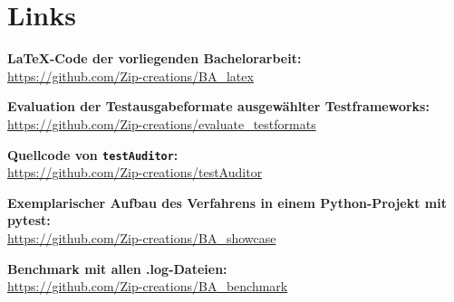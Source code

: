 \chapter{Links}\label{Links}
\textbf{\LaTeX-Code der vorliegenden Bachelorarbeit:}\\
\url{https://github.com/Zip-creations/BA_latex}

\textbf{Evaluation der Testausgabeformate ausgewählter Testframeworks:}\\
\url{https://github.com/Zip-creations/evaluate_testformats}

\textbf{Quellcode von \texttt{testAuditor}:}\\
\url{https://github.com/Zip-creations/testAuditor}

\textbf{Exemplarischer Aufbau des Verfahrens in einem Python-Projekt mit pytest:}\\
\url{https://github.com/Zip-creations/BA_showcase}

\textbf{Benchmark mit allen .log-Dateien:}\\
\url{https://github.com/Zip-creations/BA_benchmark}
